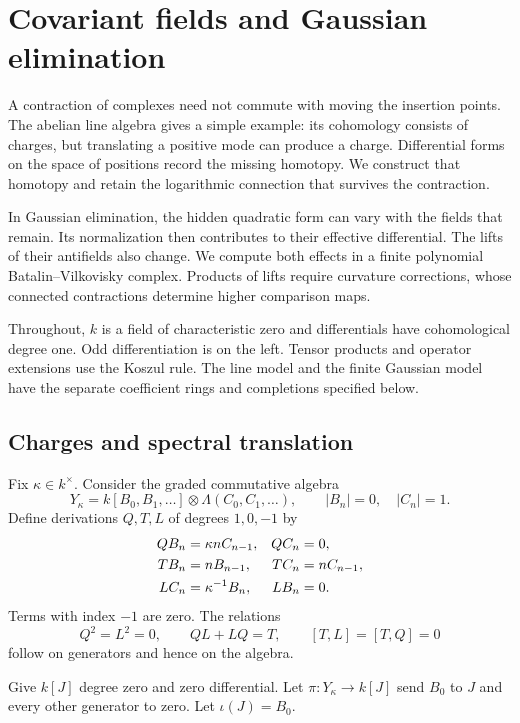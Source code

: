 \chapter{Covariant fields and Gaussian elimination}
\label{cbc:chap:covariant}

A contraction of complexes need not commute with moving the
insertion points. The abelian line algebra gives a simple example:
its cohomology consists of charges, but translating a positive mode
can produce a charge. Differential forms on the space of positions
record the missing homotopy. We construct that homotopy and retain
the logarithmic connection that survives the contraction.

In Gaussian elimination, the hidden quadratic form can vary with
the fields that remain. Its normalization then contributes to their
effective differential. The lifts of their antifields also change.
We compute both effects in a finite polynomial Batalin--Vilkovisky
complex. Products of lifts require curvature corrections, whose
connected contractions determine higher comparison maps.

Throughout, $k$ is a field of characteristic zero and differentials
have cohomological degree one. Odd differentiation is on the left.
Tensor products and operator extensions use the Koszul rule.
The line model and the finite Gaussian model have the separate
coefficient rings and completions specified below.

\section{Charges and spectral translation}
\label{cbc:cf:line}

Fix $\kappa\in k^\times$. Consider the graded commutative algebra
\[
 Y_\kappa=k[B_0,B_1,\ldots]\otimes
                 \Lambda(C_0,C_1,\ldots),
 \qquad |B_n|=0,\quad |C_n|=1.
\]
Define derivations $Q,T,L$ of degrees $1,0,-1$ by
\begin{align}
 QB_n&=\kappa nC_{n-1},& QC_n&=0,\notag\\
 TB_n&=nB_{n-1},& TC_n&=nC_{n-1},\notag\\
 LC_n&=\kappa^{-1}B_n,& LB_n&=0.
 \label{cbc:cf:operators}
\end{align}
Terms with index $-1$ are zero. The relations
\[
 Q^2=L^2=0,\qquad QL+LQ=T,\qquad [T,L]=[T,Q]=0
\]
follow on generators and hence on the algebra.

Give $k[J]$ degree zero and zero differential. Let
$\pi:Y_\kappa\to k[J]$ send $B_0$ to $J$ and every
other generator to zero. Let $\iota(J)=B_0$.

